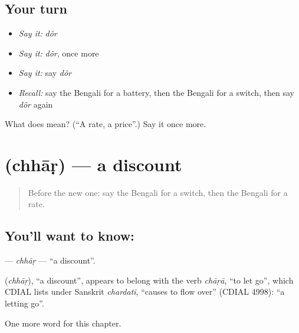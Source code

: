 \subsection*{Your turn}
\begin{itemize}
\raggedright
  \item \emph{Say it:} \emph{dôr}
  \item \emph{Say it:} \emph{dôr}, once more
  \item \emph{Say it:} say \emph{dôr}
  \item \emph{Recall:} say the Bengali for a battery, then the Bengali for a switch, then say \emph{dôr} again
\end{itemize}

\begin{tcolorbox}[breakable,colback=teal!4,colframe=teal!35!black,title={Before you move on}]
What does  mean? (\textquotedblleft{}A rate, a price\textquotedblright{}.) Say it once more.
\end{tcolorbox}
\section[\texorpdfstring{\bn{ছাড়} (chhāṛ)}{ছাড় (chhāṛ)}]{ (chhāṛ) — a discount}

\label{lesson:BN-C259-chhar}



\begin{quote}
Before the new one: say the Bengali for a switch, then the Bengali for a rate.
\end{quote}

\subsection*{You'll want to know: }
\textbf{} — \emph{chhāṛ} — \textquotedblleft{}a discount\textquotedblright{}.

\begin{cousinweb}
\textbf{} (\emph{chhāṛ}), \textquotedblleft{}a discount\textquotedblright{}, appears to belong with the verb \emph{chāṛā}, \textquotedblleft{}to let go\textquotedblright{}, which CDIAL lists under Sanskrit \emph{chardati}, \textquotedblleft{}causes to flow over\textquotedblright{} (CDIAL 4998): \textquotedblleft{}a letting go\textquotedblright{}.
\end{cousinweb}

\begin{grammarlens}[title={What you've built}]
One more word for this chapter.
\end{grammarlens}

